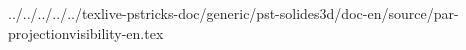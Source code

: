 ../../../../../texlive-pstricks-doc/generic/pst-solides3d/doc-en/source/par-projectionvisibility-en.tex